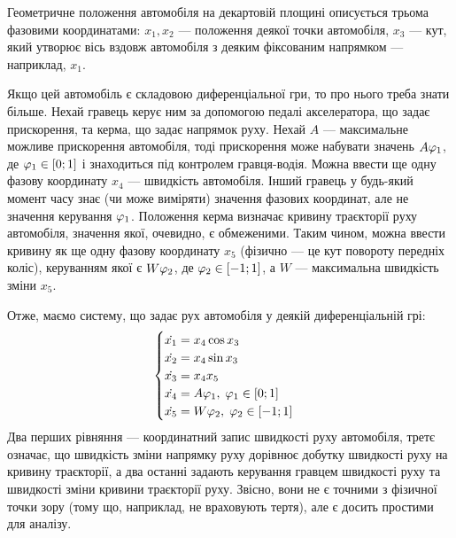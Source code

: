 \begin{example}
    Геометричне положення автомобіля на декартовій площині описується трьома фазовими координатами:
    $x_1, x_2$ --- положення деякої точки автомобіля, $x_3$ --- кут, який утворює вісь вздовж автомобіля
    з деяким фіксованим напрямком --- наприклад, $x_1$.
    \begin{center}
    \end{center}
    Якщо цей автомобіль є складовою диференціальної гри, то про нього треба знати більше. Нехай гравець керує ним за допомогою педалі акселератора, що
    задає прискорення, та керма, що задає напрямок руху. Нехай $A$ --- максимальне можливе прискорення автомобіля, тоді прискорення може набувати значень
    $A \varphi_1$, де $\varphi_1 \in [0; 1]$ і знаходиться під контролем гравця-водія. Можна ввести ще одну фазову координату $x_4$ --- швидкість автомобіля.
    Інший гравець у будь-який момент часу знає (чи може виміряти) значення фазових координат, але не значення керування $\varphi_1$. Положення керма визначає кривину траєкторії
    руху автомобіля, значення якої, очевидно, є обмеженими. Таким чином, можна ввести кривину як ще одну фазову координату $x_5$
    (фізично --- це кут повороту передніх коліс), керуванням якої є $W \varphi_2$, де $\varphi_2 \in [-1; 1]$, а $W$ --- максимальна швидкість зміни $x_5$.
    
    Отже, маємо систему, що задає рух автомобіля у деякій диференціальній грі:
    \begin{gather*}
        \begin{cases}
            \dot{x_1} = x_4 \cos{x_3} \\
            \dot{x_2} = x_4 \sin{x_3} \\
            \dot{x_3} = x_4 x_5 \\
            \dot{x_4} = A \varphi_1, \; \varphi_1 \in [0; 1] \\
            \dot{x_5} = W \varphi_2, \; \varphi_2 \in [-1; 1]
        \end{cases}
    \end{gather*}
    Два перших рівняння --- координатний запис швидкості руху автомобіля, третє означає, що швидкість зміни напрямку руху дорівнює добутку швидкості руху на кривину траєкторії,
    а два останні задають керування гравцем швидкості руху та швидкості зміни кривини траєкторії руху. Звісно, вони не є точними з фізичної точки зору (тому що, наприклад, не враховують тертя), але
    є досить простими для аналізу.
\end{example}